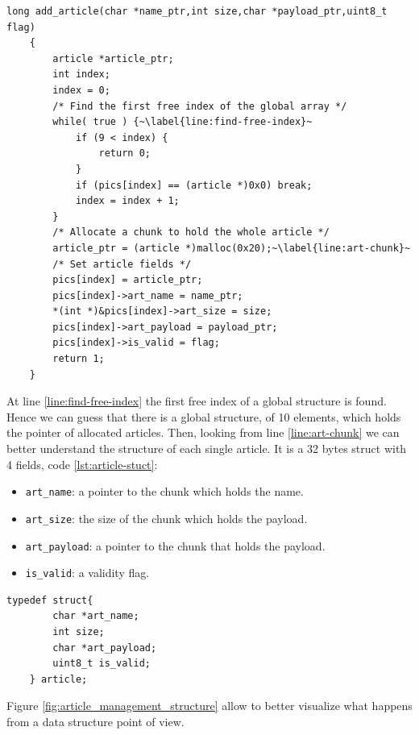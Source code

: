 \documentclass{article}
\numberwithin{equation}{subsection}
\begin{document}
\begin{minipage}{\textwidth}
\centering
\lstset{style=cstyle}
\begin{lstlisting}[caption={Add\_article routine of asciigal source code.},captionpos=b,label={lst:add-article-source}]
    long add_article(char *name_ptr,int size,char *payload_ptr,uint8_t flag)
    {
    	article *article_ptr;
    	int index;
    	index = 0;
    	/* Find the first free index of the global array */
    	while( true ) {~\label{line:find-free-index}~
    		if (9 < index) {
    			return 0;
    		}
    		if (pics[index] == (article *)0x0) break;
    		index = index + 1;
    	}
    	/* Allocate a chunk to hold the whole article */
    	article_ptr = (article *)malloc(0x20);~\label{line:art-chunk}~
    	/* Set article fields */
    	pics[index] = article_ptr;
    	pics[index]->art_name = name_ptr;
    	*(int *)&pics[index]->art_size = size;
    	pics[index]->art_payload = payload_ptr;
    	pics[index]->is_valid = flag;
    	return 1;
    }
\end{lstlisting}
\end{minipage}
At line \ref{line:find-free-index} the first free index of a global structure is found. Hence we can guess that there is a global structure, of 10 elements, which holds the pointer of allocated articles. Then, looking from line \ref{line:art-chunk} we can better understand the structure of each single article. It is a 32 bytes struct with 4 fields, code \ref{lst:article-stuct}:
\begin{itemize}
    \item \texttt{art\_name}: a pointer to the chunk which holds the name.
    \item \texttt{art\_size}: the size of the chunk which holds the payload.
    \item \texttt{art\_payload}: a pointer to the chunk that holds the payload.
    \item \texttt{is\_valid}: a validity flag.
\end{itemize}
\noindent
\begin{minipage}{\textwidth}
\centering
\lstset{style=cstyle}
\begin{lstlisting}[caption={Definition of the struct of an article.},captionpos=b,label={lst:article-stuct}]
    typedef struct{
        char *art_name;
        int size;
        char *art_payload;
        uint8_t is_valid;
    } article;
\end{lstlisting}
\end{minipage}
Figure \ref{fig:article_management_structure} allow to better visualize what happens from a data structure point of view.\newline
\end{document}
